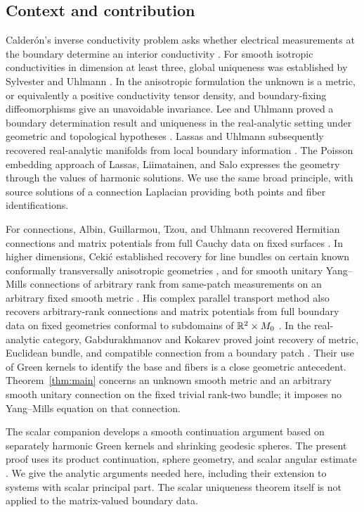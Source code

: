 \subsection{Context and contribution}
Calder\'on's inverse conductivity problem asks whether electrical
measurements at the boundary determine an interior conductivity
\cite{Calderon1980}. For smooth isotropic conductivities in dimension
at least three, global uniqueness was established by Sylvester and
Uhlmann \cite{SylvesterUhlmann1987}. In the anisotropic formulation the
unknown is a metric, or equivalently a positive conductivity tensor
density, and boundary-fixing diffeomorphisms give an unavoidable
invariance. Lee and Uhlmann proved a boundary determination result and
uniqueness in the real-analytic setting under geometric and
topological hypotheses \cite{LeeUhlmann1989}.
Lassas and Uhlmann subsequently recovered real-analytic manifolds from
local boundary information \cite{LassasUhlmann2001}.
The Poisson embedding approach of Lassas, Liimatainen, and Salo
\cite{LLS20} expresses the geometry through the values of harmonic
solutions. We use the same broad principle, with source solutions of
a connection Laplacian providing both points and fiber identifications.

For connections, Albin, Guillarmou, Tzou, and Uhlmann recovered
Hermitian connections and matrix potentials from full Cauchy data on
fixed surfaces \cite{AlbinGuillarmouTzouUhlmann2013}. In higher
dimensions, Ceki\'c established recovery for line bundles on certain
known conformally transversally anisotropic geometries
\cite{Cekic2017Connections}, and for smooth unitary Yang--Mills
connections of arbitrary rank from same-patch measurements on an
arbitrary fixed smooth metric \cite[Theorem~1.3]{Cekic2020YM}.
His complex parallel transport method also recovers arbitrary-rank
connections and matrix potentials from full boundary data on fixed
geometries conformal to subdomains of $\mathbb R^2\times M_0$
\cite[Theorem~1.1]{Cekic2025Systems}. In the real-analytic category,
Gabdurakhmanov and Kokarev proved joint recovery of metric, Euclidean
bundle, and compatible connection from a boundary patch
\cite[Theorem~1.1]{GabdurakhmanovKokarev2025}. Their use of Green kernels
to identify the base and fibers is a close geometric antecedent.
Theorem~\ref{thm:main} concerns an unknown smooth metric and an arbitrary
smooth unitary connection on the fixed trivial rank-two bundle; it
imposes no Yang--Mills equation on that connection.

The scalar companion \cite{ScalarCompanion2026} develops a smooth
continuation argument based on separately harmonic Green kernels and
shrinking geodesic spheres. The present proof uses its product
continuation, sphere geometry, and scalar angular estimate
\cite[Sections~3--5]{ScalarCompanion2026}. We give the analytic arguments
needed here, including their extension to systems with scalar principal
part. The scalar uniqueness theorem itself is not applied to the
matrix-valued boundary data.

